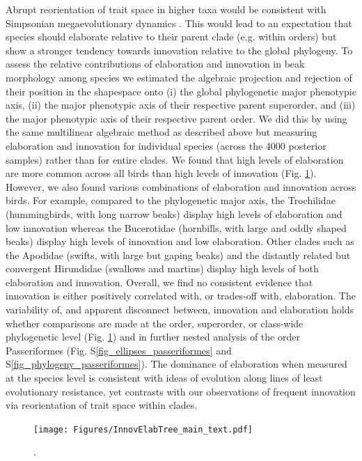 \documentclass[12pt,letterpaper]{article}
\begin{document}
Abrupt reorientation of trait space in higher taxa would be consistent with Simpsonian megaevolutionary dynamics \cite{simpson1953major}.
This would lead to an expectation that species should elaborate relative to their parent clade (e.g. within orders) but show a stronger tendency towards innovation relative to the global phylogeny.
To assess the relative contributions of elaboration and innovation in beak morphology among species we estimated the algebraic projection and rejection of their position in the shapespace onto (i) the global phylogenetic major phenotypic axis, (ii) the major phenotypic axis of their respective parent superorder, and (iii) the major phenotypic axis of their respective parent order.
We did this by using the same multilinear algebraic method as described above but measuring elaboration and innovation for individual species (across the 4000 posterior samples) rather than for entire clades.
We found that high levels of elaboration are more common across all birds than high levels of innovation (Fig. \ref{Fig:phylogeny}).
However, we also found various combinations of elaboration and innovation across birds.
For example, compared to the phylogenetic major axis, the Trochilidae (hummingbirds, with long narrow beaks) display high levels of elaboration and low innovation whereas the Bucerotidae (hornbills, with large and oddly shaped beaks) display high levels of innovation and low elaboration.
Other clades such as the Apodidae (swifts, with large but gaping beaks) and the distantly related but convergent Hirundidae (swallows and martins) display high levels of both elaboration and innovation.
Overall, we find no consistent evidence that innovation is either positively correlated with, or trades-off with, elaboration. %
The variability of, and apparent disconnect between, innovation and elaboration holds whether comparisons are made at the order, superorder, or class-wide phylogenetic level (Fig. \ref{Fig:phylogeny})%
 and in further nested analysis of the order Passeriformes (Fig. S\ref{fig_ellipses_passeriformes} and S\ref{fig_phylogeny_passeriformes}).
The dominance of elaboration when measured at the species level is consistent with ideas of evolution along lines of least evolutionary resistance, yet contrasts with our observations of frequent innovation via reorientation of trait space within clades.

\begin{figure}[!htbp]
\centering
    \texttt{[image: Figures/InnovElabTree\_main\_text.pdf]}
\caption{.}
\label{Fig:phylogeny}
\end{figure}
\end{document}
